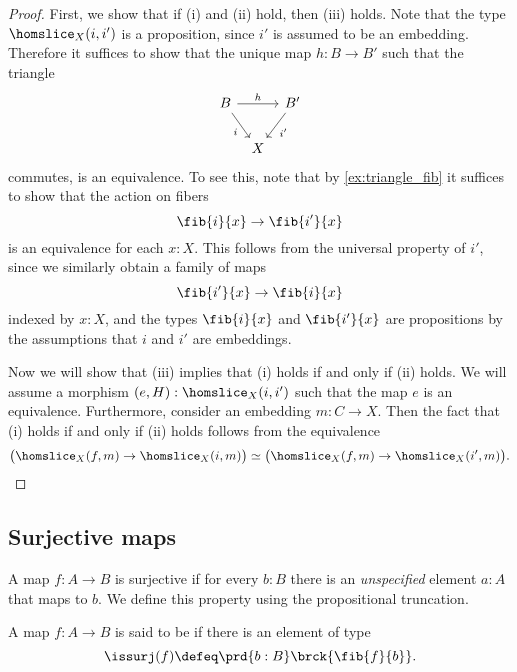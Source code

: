 \begin{proof}
  First, we show that if (i) and (ii) hold, then (iii) holds. Note that the type $\homslice_X(i,i')$ is a proposition, since $i'$ is assumed to be an embedding. Therefore it suffices to show that the unique map $h:B\to B'$ such that the triangle
  \begin{equation*}
    \begin{tikzcd}[column sep=tiny]
      B \arrow[dr,swap,"i"] \arrow[rr,"h"] & & B' \arrow[dl,"{i'}"] \\
      & X
    \end{tikzcd}
  \end{equation*}
  commutes, is an equivalence. To see this, note that by \cref{ex:triangle_fib} it suffices to show that the action on fibers
  \begin{equation*}
    \fib{i}{x}\to\fib{i'}{x}
  \end{equation*}
  is an equivalence for each $x:X$. This follows from the universal property of $i'$, since we similarly obtain a family of maps
  \begin{equation*}
    \fib{i'}{x}\to\fib{i}{x}
  \end{equation*}
  indexed by $x:X$, and the types $\fib{i}{x}$ and $\fib{i'}{x}$ are propositions by the assumptions that $i$ and $i'$ are embeddings.
  
  Now we will show that (iii) implies that (i) holds if and only if (ii) holds. We will assume a morphism $(e,H):\homslice_X(i,i')$ such that the map $e$ is an equivalence. Furthermore, consider an embedding $m:C\to X$. Then the fact that (i) holds if and only if (ii) holds follows from the equivalence
  \begin{equation*}
    \big(\homslice_X(f,m)\to\homslice_X(i,m)\big)\simeq\big(\homslice_X(f,m)\to\homslice_X(i',m)\big).\qedhere
  \end{equation*}
\end{proof}

\subsection{Surjective maps}\label{subsec:surjective}

A map $f:A\to B$ is surjective if for every $b:B$ there is an \emph{unspecified} element $a:A$ that maps to $b$. We define this property using the propositional truncation.

\begin{defn}
A map $f:A\to B$ is said to be  if there is an element of type
\begin{equation*}
\issurj(f)\defeq \prd{b:B}\brck{\fib{f}{b}}.
\end{equation*}
\end{defn}

